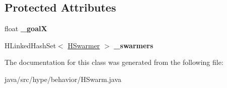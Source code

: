 \subsection*{Protected Attributes}
\begin{DoxyCompactItemize}
\item 
\hypertarget{classhype_1_1behavior_1_1_h_swarm_a82d5808ca78e66936c20d55b4ae140d4}{float {\bfseries \-\_\-goal\-X}}\label{classhype_1_1behavior_1_1_h_swarm_a82d5808ca78e66936c20d55b4ae140d4}

\item 
\hypertarget{classhype_1_1behavior_1_1_h_swarm_a496a11ba4ddf5ff870c5017682d2e5a9}{H\-Linked\-Hash\-Set$<$ \hyperlink{interfacehype_1_1interfaces_1_1_h_swarmer}{H\-Swarmer} $>$ {\bfseries \-\_\-swarmers}}\label{classhype_1_1behavior_1_1_h_swarm_a496a11ba4ddf5ff870c5017682d2e5a9}

\end{DoxyCompactItemize}


The documentation for this class was generated from the following file\-:\begin{DoxyCompactItemize}
\item 
java/src/hype/behavior/H\-Swarm.\-java\end{DoxyCompactItemize}
